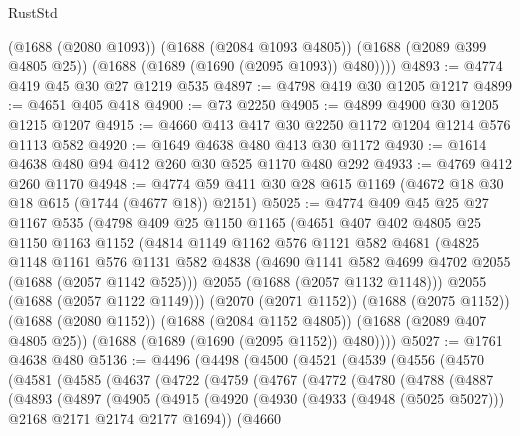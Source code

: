 \begin{lexlean}{RustStd}
\begin{coremodule}
        (@1688 (@2080 @1093))
        (@1688 (@2084 @1093 @4805))
        (@1688 (@2089 @399 @4805 @25))
        (@1688 (@1689 (@1690 (@2095 @1093)) @480))))
@4893 := @4774 @419 @45 @30 @27 @1219 @535
@4897 := @4798 @419 @30 @1205 @1217
@4899 := @4651 @405 @418
@4900 := @73 @2250
@4905 := @4899 @4900 @30 @1205 @1215 @1207
@4915 := @4660 @413 @417 @30 @2250 @1172 @1204 @1214 @576 @1113 @582
@4920 := @1649 @4638 @480 @413 @30 @1172
@4930 := @1614 @4638 @480 @94 @412 @260 @30 @525 @1170 @480 @292
@4933 := @4769 @412 @260 @1170
@4948 := @4774 @59 @411 @30 @28 @615 @1169 (@4672 @18 @30 @18 @615 (@1744 (@4677 @18)) @2151)
@5025 := @4774
    @409
    @45
    @25
    @27
    @1167
    @535
    (@4798
      @409
      @25
      @1150
      @1165
      (@4651
        @407
        @402
        @4805
        @25
        @1150
        @1163
        @1152
        (@4814
          @1149
          @1162
          @576
          @1121
          @582
          @4681
          (@4825
            @1148
            @1161
            @576
            @1131
            @582
            @4838
            (@4690 @1141 @582 @4699 @4702 @2055 (@1688 (@2057 @1142 @525)))
            @2055
            (@1688 (@2057 @1132 @1148)))
          @2055
          (@1688 (@2057 @1122 @1149)))
        (@2070 (@2071 @1152))
        (@1688 (@2075 @1152))
        (@1688 (@2080 @1152))
        (@1688 (@2084 @1152 @4805))
        (@1688 (@2089 @407 @4805 @25))
        (@1688 (@1689 (@1690 (@2095 @1152)) @480))))
@5027 := @1761 @4638 @480
@5136 := @4496
    (@4498
      (@4500
        (@4521
          (@4539
            (@4556
              (@4570
                (@4581
                  (@4585
                    (@4637
                      (@4722
                        (@4759
                          (@4767
                            (@4772
                              (@4780
                                (@4788
                                  (@4887
                                    (@4893
                                      (@4897
                                        (@4905
                                          (@4915
                                            (@4920
                                              (@4930
                                                (@4933 (@4948 (@5025 @5027)))
                                                @2168
                                                @2171
                                                @2174
                                                @2177
                                                @1694))
                                            (@4660

\end{coremodule}
\end{lexlean}
